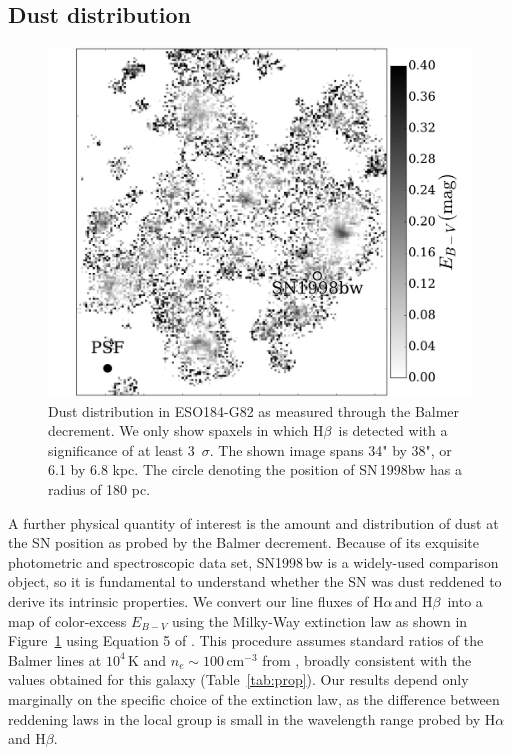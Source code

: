 \documentclass[traditabstract]{aa}
\newcommand{\hb}{H$\beta$}
\newcommand{\ha}{H$\alpha$}
\begin{document}
\subsection{Dust distribution}

\begin{figure}
\includegraphics[angle=0, width=0.99\columnwidth]{Figs/MUSE_SN1998bw_EB-V.pdf}
\caption{Dust distribution in ESO184-G82 as measured through the Balmer decrement. We only show spaxels in which \hb\, is detected with a significance of at least 3~$\sigma$. The shown image spans 34" by 38", or 6.1 by 6.8 kpc. The circle denoting the position of SN\,1998bw has a radius of 180 pc.}
\label{fig:ebv}
\end{figure}

A further physical quantity of interest is the amount and distribution of dust at the SN position as probed by the Balmer decrement. Because of its exquisite photometric and spectroscopic data set, SN1998\,bw is a widely-used comparison object, so it is fundamental to understand whether the SN was dust reddened to derive its intrinsic properties. We convert our line fluxes of \ha\,and \hb\, into a map of color-excess $E_{B-V}$ using the Milky-Way extinction law as shown in Figure~\ref{fig:ebv} using Equation 5 of \citet{2015A&A...581A.125K}. This procedure assumes standard ratios of the Balmer lines at $10^4$\,K and $n_e\sim100\,\mathrm{cm}^{-3}$ from \citet{1989agna.book.....O}, broadly consistent with the values obtained for this galaxy (Table~\ref{tab:prop}). Our results depend only marginally on the specific choice of the extinction law, as the difference between reddening laws in the local group is small in the wavelength range probed by \ha\, and \hb. 
\end{document}
